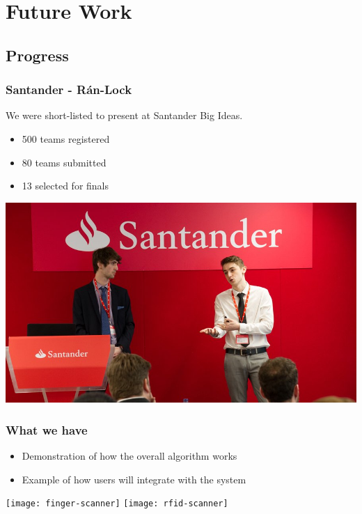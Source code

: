 \documentclass{beamer}
\begin{document}
  \section{Future Work}
    \subsection{Progress}
      \begin{frame}
        \frametitle{Santander - R\'{a}n-Lock}
        We were short-listed to present at Santander Big Ideas.
        \begin{itemize}
          \item 500 teams registered
          \item 80 teams submitted
          \item 13 selected for finals
        \end{itemize}
        \vfill
        \begin{center}
          \includegraphics[scale=0.25]{santander}
        \end{center}
      \end{frame}
      \begin{frame}
        \frametitle{What we have}
        \begin{itemize}
          \item Demonstration of how the overall algorithm works
          \item Example of how users will integrate with the system
        \end{itemize}
        \vfill
        \texttt{[image: finger-scanner]}
        \hfill
        \texttt{[image: rfid-scanner]}
      \end{frame}
\end{document}
